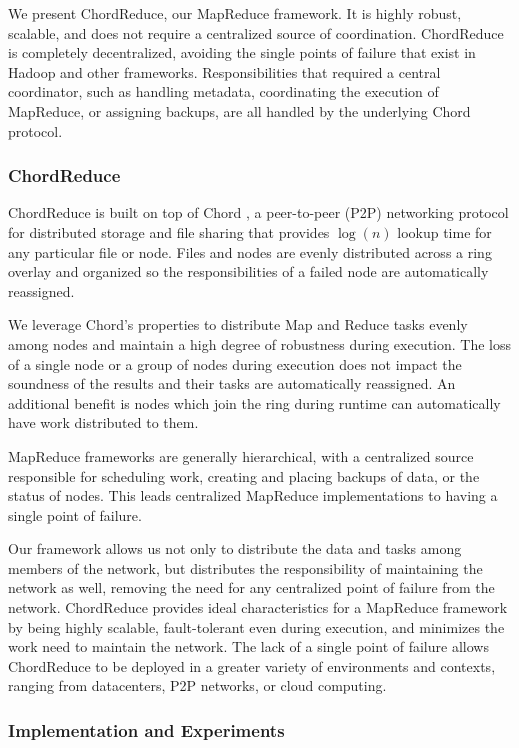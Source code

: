 \documentclass{article}
\begin{document}
We present ChordReduce, our MapReduce framework.  It is highly robust, scalable, and does not require a centralized source of coordination.  ChordReduce is completely decentralized, avoiding the single points of failure that exist in Hadoop and other frameworks. Responsibilities  that required a central coordinator, such as handling metadata, coordinating the execution of MapReduce, or assigning backups,  are all handled by the underlying Chord protocol.

\subsubsection*{ChordReduce}

ChordReduce is built on top of Chord \cite{Chord}, a peer-to-peer (P2P) networking protocol for distributed storage and file sharing that provides $\log(n)$ lookup time for any particular file or node.
Files and nodes are evenly distributed across a ring overlay and organized so the responsibilities of a failed node are automatically reassigned. 

We leverage Chord's properties to distribute Map and Reduce tasks evenly among nodes and maintain a high degree of robustness during execution.  
The loss of a single node or a group of nodes during execution does not impact the soundness of the results and their tasks are automatically reassigned. 
An additional benefit is nodes which join the ring during runtime can automatically have work distributed to them.

MapReduce frameworks are generally hierarchical, with a centralized source responsible for scheduling work, creating and placing backups of data, or the status of nodes.  This leads centralized MapReduce implementations to having a single point of failure.

Our framework allows us not only to distribute the data and tasks among members of the network, but distributes the responsibility of maintaining the network as well, removing the need for any centralized point of failure from the network.
ChordReduce provides ideal characteristics for a MapReduce framework by being highly scalable, fault-tolerant even during execution, and minimizes the work need to maintain the network.  The lack of a single point of failure allows ChordReduce to be deployed in a greater variety of environments and contexts, ranging from datacenters, P2P networks, or cloud computing.


\subsubsection*{Implementation and Experiments}
\end{document}
